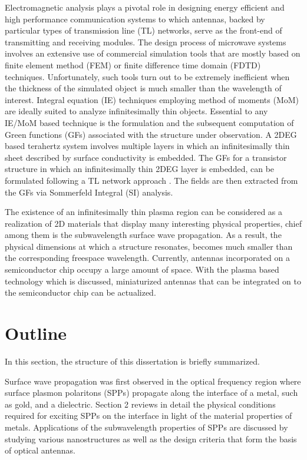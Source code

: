 Electromagnetic analysis plays a pivotal role in designing energy efficient and high performance communication systems to which antennas, backed by particular types of transmission line (TL) networks, serve as the front-end of transmitting and receiving modules. The design process of microwave systems involves an extensive use of commercial simulation tools that are mostly based on finite element method (FEM) or finite difference time domain (FDTD) techniques. Unfortunately, such tools turn out to be extremely inefficient when the thickness of the simulated object is much smaller than the wavelength of interest. Integral equation (IE) techniques employing method of moments (MoM) are ideally suited to analyze infinitesimally thin objects. Essential to any IE/MoM based technique is the formulation and the subsequent computation of Green functions (GFs) associated with the structure under observation. A 2DEG based terahertz system involves multiple layers in which an infinitesimally thin sheet described by surface conductivity is embedded. The GFs for a transistor structure in which an infinitesimally thin 2DEG layer is embedded, can be formulated following a TL network approach
\cite{Michalski1997}. The fields are then extracted from the GFs via Sommerfeld Integral (SI) analysis.

The existence of an infinitesimally thin plasma region can be considered as a realization of 2D materials that display many interesting physical properties, chief among them is the subwavelength surface wave propagation. As a result, the physical dimensions at which a structure resonates, becomes much smaller than the corresponding freespace wavelength. Currently, antennas incorporated on a semiconductor chip occupy a large amount of space. With the plasma based technology which is discussed, miniaturized antennas that can be integrated on to the semiconductor chip can be actualized.
\section{Outline}
%
In this section, the structure of this dissertation is briefly summarized.

Surface wave propagation was first observed in the optical frequency region where surface plasmon polaritons (SPPs) propagate along the interface of a metal, such as gold, and a dielectric. Section 2 reviews in detail the physical conditions required for exciting SPPs on the interface in light of the material properties of metals. Applications of the subwavelength properties of SPPs are discussed by studying various nanostructures as well as the design criteria that form the basis of optical antennas.

